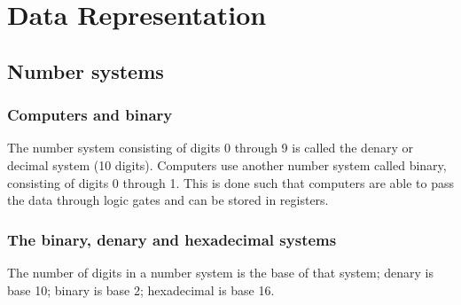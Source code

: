 \documentclass[twocolumn]{article}
\begin{document}
\section {Data Representation}
\subsection{Number systems}

\subsubsection{Computers and binary}
The number system consisting of digits 0 through 9 is called the denary or decimal system
(10 digits). Computers use another number system called binary, consisting of digits
0 through 1. This is done such that computers are able to pass the data through logic 
gates and can be stored in registers.

\subsubsection{The binary, denary and hexadecimal systems}
The number of digits in a number system is the base of that system; denary is base 10;
binary is base 2; hexadecimal is base 16.
\end{document}
